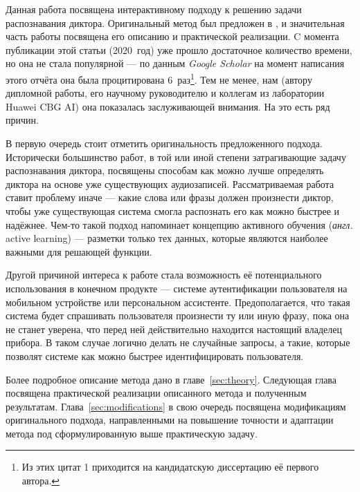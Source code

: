 Данная работа посвящена интерактивному подходу к решению задачи распознавания
диктора.  Оригинальный метод был предложен в \citeisr, и значительная часть
работы посвящена его описанию и практической реализации. C момента публикации
этой статьи (2020~год) уже прошло достаточное количество времени, но она не
стала популярной --- по данным \textit{Google Scholar} на момент написания
этого отчёта она была процитирована 6~раз\footnote{
    Из этих цитат 1 приходится на кандидатскую диссертацию её первого автора.
}.
Тем не менее, нам (автору дипломной работы, его научному руководителю и коллегам
из лаборатории Huawei CBG AI) она показалась заслуживающей внимания. На это есть
ряд причин.

В первую очередь стоит отметить оригинальность предложенного подхода.
Исторически большинство работ, в той или иной степени затрагивающие задачу
распознавания диктора, посвящены способам как можно лучше определять диктора
на основе уже существующих аудиозаписей. Рассматриваемая работа ставит проблему иначе --- какие
слова или фразы должен произнести диктор, чтобы уже существующая система
смогла распознать его как можно быстрее и надёжнее. Чем-то такой подход
напоминает концепцию активного обучения (\textit{англ.} active learning) ---
разметки только тех данных, которые являются наиболее важными для решающей
функции.

Другой причиной интереса к работе стала возможность её потенциального использования
в конечном продукте --- системе аутентификации пользователя на мобильном устройстве
или персональном ассистенте. Предополагается, что такая система будет спрашивать
пользователя произнести ту или иную фразу, пока она не станет уверена, что перед
ней действительно находится настоящий владелец прибора. В таком случае логично
делать не случайные запросы, а такие, которые позволят системе как можно быстрее
идентифицировать пользователя. 

Более подробное описание метода дано в главе~\ref{sec:theory}. Следующая глава
посвящена практической реализации описанного метода и полученным результатам.
Глава~\ref{sec:modifications} в свою очередь посвящена модификациям
оригинального подхода, направленными на повышение точности и адаптации метода
под сформулированную выше практическую задачу.